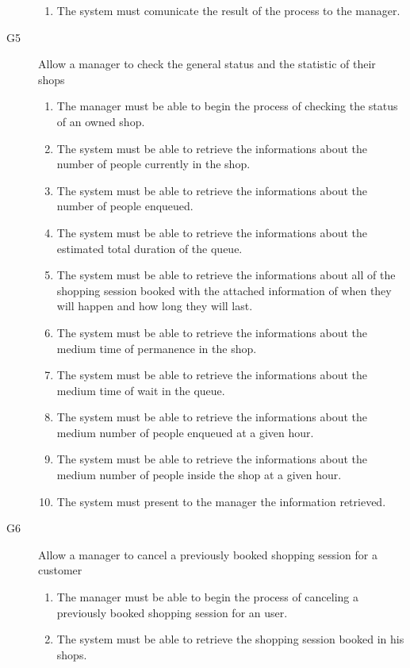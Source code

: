 \begin{description}
\begin{enumerate}[resume*]
            \item The system must comunicate the result of the process to the manager. 
        \end{enumerate}
    \item [G5] Allow a manager to check the general status and the statistic of their shops
        \begin{enumerate}[resume*]
            \item The manager must be able to begin the process of checking the status of an owned shop.
            \item The system must be able to retrieve the informations about the number of people currently in the shop.
            \item The system must be able to retrieve the informations about the number of people enqueued.
            \item The system must be able to retrieve the informations about the estimated total duration of the queue.
            \item The system must be able to retrieve the informations about all of the shopping session booked with the attached information of when they will happen and how long they will last.
            \item The system must be able to retrieve the informations about the medium time of permanence in the shop. 
            \item The system must be able to retrieve the informations about the medium time of wait in the queue.
            \item The system must be able to retrieve the informations about the medium number of people enqueued at a given hour.
            \item The system must be able to retrieve the informations about the medium number of people inside the shop at a given hour.
            \item The system must present to the manager the information retrieved.
        \end{enumerate}
    \item [G6] Allow a manager to cancel a previously booked shopping session for a customer %
        \begin{enumerate}[resume*]
            \item The manager must be able to begin the process of canceling a previously booked shopping session for an user.
            \item The system must be able to retrieve the shopping session booked in his shops.

\end{enumerate}
\end{description}

